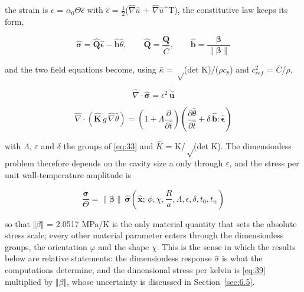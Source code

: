 \documentclass[preprint,12pt]{elsarticle}
\begin{document}
the strain is $\epsilon$ = $\alpha_{0}\Theta \hat{\epsilon}$ with $\hat{\epsilon}$ = $\frac{1}{2}$($\hat{\nabla}\hat{u}$ + $\hat{\nabla}\hat{u}$^{T}), the constitutive law keeps its form,

\begin{equation}
\hat{\boldsymbol{\sigma}}=\hat{\mathbf{Q}}\hat{\boldsymbol{\epsilon}}-\hat{\mathbf{b}}\hat\theta,\qquad \hat{\mathbf{Q}}=\frac{\mathbf{Q}}{\bar C},\qquad \hat{\mathbf{b}}=\frac{\boldsymbol{\beta}}{\|\boldsymbol{\beta}\|} 
\label{eq:36}
\end{equation}

and the two field equations become, using $\bar{\kappa}$ = $\sqrt$(det K)/($\rho c_{p}$) and $c_{ref}^{2}$ = $\bar{C}$/$\rho$,

\begin{equation}
\hat\nabla\cdot\hat{\boldsymbol{\sigma}}=\epsilon^2\,\ddot{\hat{\mathbf{u}}} 
\label{eq:37}
\end{equation}

\begin{equation}
\hat\nabla\cdot\left(\hat{\mathbf{K}}\,g\,\hat\nabla\hat\theta\right)=\left(1+\Lambda\frac{\partial}{\partial\hat t}\right)\left(\frac{\partial\hat\theta}{\partial\hat t}+\delta\,\hat{\mathbf{b}}:\dot{\hat{\boldsymbol{\epsilon}}}\right) 
\label{eq:38}
\end{equation}

with $\Lambda$, $\varepsilon$ and $\delta$ the groups of \eqref{eq:33} and $\hat{K}$ = K/$\sqrt$(det K). The dimensionless problem therefore depends on the cavity size a only through $\varepsilon$, and the stress per unit wall-temperature amplitude is

\begin{equation}
\frac{\boldsymbol{\sigma}}{\Theta}=\|\boldsymbol{\beta}\|\,\hat{\boldsymbol{\sigma}}\left(\hat{\mathbf{x}};\,\phi,\chi,\frac{R}{a},\Lambda,\epsilon,\delta,t_0,t_w\right) 
\label{eq:39}
\end{equation}

so that $\Vert \beta \Vert$ = 2.0517 MPa/K is the only material quantity that sets the absolute stress scale; every other material parameter enters through the dimensionless groups, the orientation $\varphi$ and the shape $\chi$. This is the sense in which the results below are relative statements: the dimensionless response $\hat{\sigma}$ is what the computations determine, and the dimensional stress per kelvin is \eqref{eq:39} multiplied by $\Vert \beta \Vert$, whose uncertainty is discussed in Section~\ref{sec:6.5}.
\end{document}
